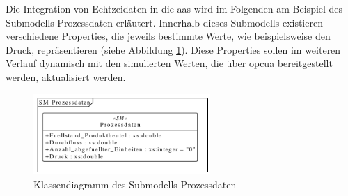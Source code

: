 


Die Integration von Echtzeidaten in die \acs{aas} wird im Folgenden am Beispiel des Submodells Prozessdaten erläutert.
Innerhalb dieses Submodells existieren verschiedene Properties, die jeweils bestimmte Werte, wie beispielsweise den Druck, repräsentieren (siehe Abbildung \ref{fig:UMLSubmodellProcessData}). 
Diese Properties sollen im weiteren Verlauf dynamisch mit den simulierten Werten, die über \acs{opcua} bereitgestellt werden, aktualisiert werden.

\begin{figure}[htbp]
    \centering
    \includegraphics[width=0.6\textwidth]{Bilder/UML/submodel_processdata.pdf}
    \caption{Klassendiagramm des Submodells Prozessdaten}
    \label{fig:UMLSubmodellProcessData}
\end{figure}

